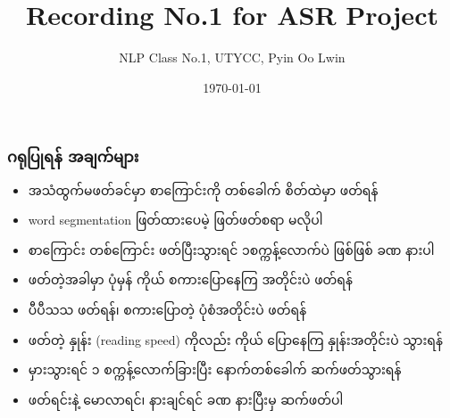 \documentclass{beamer}
\title[Recording No.1 for ASR Project]{Recording No.1 for ASR Project} %
\author{NLP Class No.1, UTYCC, Pyin Oo Lwin}
\institute[UTYCC] %
{
Prepared by Ye Kyaw Thu\\
Visiting Professor\\
Semantic Technology Research Team (LST)\\  %
Artificial Intelligence Research Group (ANRG)\\
National Electronics and Computer Technology Center (NECTEC)\\
\medskip
\textit{ka2pluskha2@gmail.com} %
}
\date{\today} %
\begin{document}
\begin{frame}
\titlepage %
\end{frame}


\begin{frame}
\frametitle{\padauktext ဂရုပြုရန် အချက်များ}

\begin{itemize}
\item {\padauktext အသံထွက်မဖတ်ခင်မှာ စာကြောင်းကို တစ်ခေါက် စိတ်ထဲမှာ ဖတ်ရန်}
\item word segmentation {\padauktext ဖြတ်ထားပေမဲ့ ဖြတ်ဖတ်စရာ မလိုပါ}
\item {\padauktext စာကြောင်း တစ်ကြောင်း ဖတ်ပြီးသွားရင် ၁စက္ကန့်လောက်ပဲ ဖြစ်ဖြစ် ခဏ နားပါ}
\item {\padauktext ဖတ်တဲ့အခါမှာ ပုံမှန် ကိုယ် စကားပြောနေကြ အတိုင်းပဲ ဖတ်ရန်}
\item {\padauktext ပီပီသသ ဖတ်ရန်၊ စကားပြောတဲ့ ပုံစံအတိုင်းပဲ ဖတ်ရန်}
\item {\padauktext ဖတ်တဲ့ နှုန်း }(reading speed) {\padauktext ကိုလည်း ကိုယ် ပြောနေကြ နှုန်းအတိုင်းပဲ သွားရန်}
\item {\padauktext မှားသွားရင် ၁ စက္ကန့်လောက်ခြားပြီး နောက်တစ်ခေါက် ဆက်ဖတ်သွားရန်}
\item {\padauktext ဖတ်ရင်းနဲ့ မောလာရင်၊ နားချင်ရင် ခဏ နားပြီးမှ ဆက်ဖတ်ပါ}
\end{itemize}

\end{frame}

\end{document}
